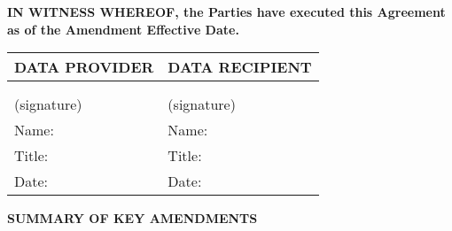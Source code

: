 \documentclass[12pt,letterpaper]{article}
\newcommand{\added}[1]{\textcolor{addcolor}{#1}}
\begin{document}
\vspace{0.5cm}

\textbf{IN WITNESS WHEREOF, the Parties have executed this Agreement as of the \added{Amendment} Effective Date.}

\vspace{1cm}

\begin{tabular}{|p{}|p{}|}
\hline
\textbf{DATA PROVIDER} & \textbf{DATA RECIPIENT} \\
\hline
 & \\
 & \\
\hline
(signature) & (signature) \\
\hline
Name: & Name: \\
\hline
Title: & Title: \\
\hline
Date: & Date: \\
\hline
\end{tabular}

\vspace{2cm}

\begin{center}
\textbf{\Large SUMMARY OF KEY AMENDMENTS}
\end{center}
\end{document}
